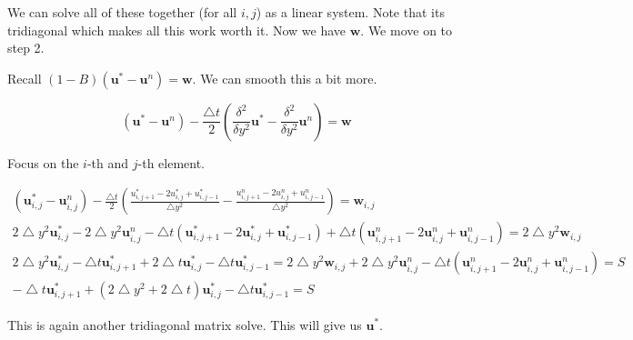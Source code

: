 \documentclass[12pt]{article}
\begin{document}
We can solve all of these together (for all $i,j$) as a linear system. Note that its tridiagonal which makes all this work worth it. Now we have $\mathbf{w}$. We move on to step 2.

Recall $(1 - B)(\mathbf{u}^* - \mathbf{u}^n) = \mathbf{w}$. We can smooth this a bit more.

\begin{equation}
    (\mathbf{u}^* - \mathbf{u}^n) - \frac{\bigtriangleup t}{2}(\frac{\delta^2}{\delta y^2} \mathbf{u}^* - \frac{\delta^2}{\delta y^2} \mathbf{u}^n) = \mathbf{w}
\end{equation}

Focus on the $i$-th and $j$-th element.

\begin{align*}
    (\mathbf{u}^*_{i,j} - \mathbf{u}^n_{i,j}) - \frac{\bigtriangleup t}{2}(\frac{u^*_{i,j+1} - 2u^*_{i,j} + u^*_{i,j-1}}{\bigtriangleup y^2} - \frac{u^n_{i,j+1} - 2u^n_{i,j} + u^n_{i,j-1}}{\bigtriangleup y^2}) = \mathbf{w}_{i,j} \\
    2\bigtriangleup y^2 \mathbf{u}^*_{i,j} - 2\bigtriangleup y^2 \mathbf{u}^n_{i,j} - \bigtriangleup t(\mathbf{u}^*_{i,j+1} - 2\mathbf{u}^*_{i,j} + \mathbf{u}^*_{i,j-1}) + \bigtriangleup t(\mathbf{u}^n_{i,j+1} - 2\mathbf{u}^n_{i,j} + \mathbf{u}^n_{i,j-1}) = 2\bigtriangleup y^2 \mathbf{w}_{i,j} \\
    2\bigtriangleup y^2 \mathbf{u}^*_{i,j} - \bigtriangleup t \mathbf{u}^*_{i,j+1} + 2\bigtriangleup t \mathbf{u}^*_{i,j} - \bigtriangleup t \mathbf{u}^*_{i,j-1} = 2\bigtriangleup y^2 \mathbf{w}_{i,j} + 2\bigtriangleup y^2 \mathbf{u}^n_{i,j} - \bigtriangleup t(\mathbf{u}^n_{i,j+1} - 2\mathbf{u}^n_{i,j} + \mathbf{u}^n_{i,j-1}) = S \\
    -\bigtriangleup t \mathbf{u}^*_{i,j+1} + (2\bigtriangleup y^2 + 2\bigtriangleup t)\mathbf{u}^*_{i,j} - \bigtriangleup t \mathbf{u}^*_{i,j-1} = S
\end{align*}

This is again another tridiagonal matrix solve. This will give us $\mathbf{u}^*$.
\end{document}
